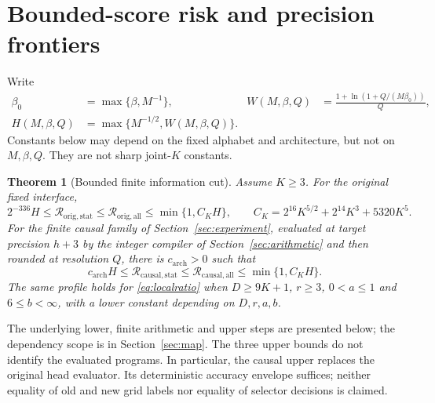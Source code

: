 \documentclass[11pt,letterpaper]{article}
\newtheorem{theorem}{Theorem}[section]
\theoremstyle{definition}\newtheorem{definition}[theorem]{Definition}
\theoremstyle{remark}\newtheorem{remark}[theorem]{Remark}
\newcommand{\betaz}{\beta_0}
\newcommand{\Risk}{\mathcal{R}}
\begin{document}
\section{Bounded-score risk and precision frontiers}\label{sec:main}
Write
\begin{equation}\label{eq:profile}
 \begin{aligned}
 \betaz&=\max\{\beta,M^{-1}\},&
 W(M,\beta,Q)&=\frac{1+\ln(1+Q/(M\betaz))}{Q},\\
 H(M,\beta,Q)&=\max\{M^{-1/2},W(M,\beta,Q)\}.&&
 \end{aligned}
\end{equation}
Constants below may depend on the fixed alphabet and architecture, but not on $M,\beta,Q$. They are not sharp joint-$K$ constants.

\begin{theorem}[Bounded finite information cut]\label{thm:main}
Assume $K\ge3$. For the original fixed interface,
\begin{equation}\label{eq:original}
 2^{-336}H\le\Risk_{\mathrm{orig},\mathrm{stat}}
 \le\Risk_{\mathrm{orig},\mathrm{all}}\le\min\{1,C_KH\},
 \qquad C_K=2^{16}K^{5/2}+2^{14}K^3+5320K^5.
\end{equation}
For the finite causal family of Section~\ref{sec:experiment}, evaluated at target precision $h+3$ by the integer compiler of Section~\ref{sec:arithmetic} and then rounded at resolution $Q$, there is $c_{\mathrm{arch}}>0$ such that
\begin{equation}\label{eq:causalmain}
 c_{\mathrm{arch}}H\le\Risk_{\mathrm{causal},\mathrm{stat}}
 \le\Risk_{\mathrm{causal},\mathrm{all}}\le\min\{1,C_KH\}.
\end{equation}
The same profile holds for \eqref{eq:localratio} when $D\ge9K+1$, $r\ge3$, $0<a\le1$ and $6\le b<\infty$, with a lower constant depending on $D,r,a,b$.
\end{theorem}

The underlying lower, finite arithmetic and upper steps are presented below; the dependency scope is in Section~\ref{sec:map}. The three upper bounds do not identify the evaluated programs. In particular, the causal upper replaces the original head evaluator. Its deterministic accuracy envelope suffices; neither equality of old and new grid labels nor equality of selector decisions is claimed.
\end{document}
